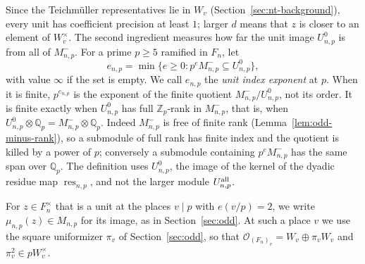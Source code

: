\documentclass[11pt]{article}
\theoremstyle{plain}
\theoremstyle{definition}
\theoremstyle{remark}
\newcommand{\Z}{\mathbb Z}
\newcommand{\Q}{\mathbb Q}
\newcommand{\OO}{\mathcal O}
\begin{document}
Since the Teichm\"uller representatives lie in $W_v$
(Section~\ref{sec:nt-background}), every unit has
coefficient precision at least $1$; larger $d$ means that $z$ is closer
to an element of $W_v^\times$.  The second ingredient measures how far the
unit image $U^0_{n,p}$ is from all of $M^-_{n,p}$.  For a prime $p\ge5$
ramified in $F_n$, let
\begin{equation}\label{eq:unit-index-exponent}
 e_{n,p}=\min\{e\ge0:p^eM_{n,p}^-\subseteq U_{n,p}^0\},
\end{equation}
with value $\infty$ if the set is empty.  We call $e_{n,p}$ the
\emph{unit index exponent} at $p$.  When it is finite, $p^{e_{n,p}}$ is
the exponent of the finite quotient $M_{n,p}^-/U_{n,p}^0$, not its order.
It is finite exactly when $U_{n,p}^0$ has full $\Z_p$-rank in
$M_{n,p}^-$, that is, when $U_{n,p}^0\otimes\Q_p=M_{n,p}^-\otimes\Q_p$.
Indeed $M_{n,p}^-$ is free of finite rank
(Lemma~\ref{lem:odd-minus-rank}), so a submodule of full rank has finite
index and the quotient is killed by a power of $p$; conversely a
submodule containing $p^eM_{n,p}^-$ has the same span over $\Q_p$.  The
definition uses $U^0_{n,p}$, the image of the kernel of the dyadic
residue map $\operatorname{res}_{n,p}$, and not the larger module
$U^{\rm all}_{n,p}$.

For $z\in F_n^\times$ that is a unit at the places $v\mid p$ with
$e(v/p)=2$, we write $\mu_{n,p}(z)\in M_{n,p}$ for its image, as in
Section~\ref{sec:odd}.  At such a place $v$ we use the square uniformizer
$\pi_v$ of Section~\ref{sec:odd}, so that
$\OO_{(F_n)_v}=W_v\oplus\pi_vW_v$ and $\pi_v^2\in pW_v^\times$.
\end{document}
